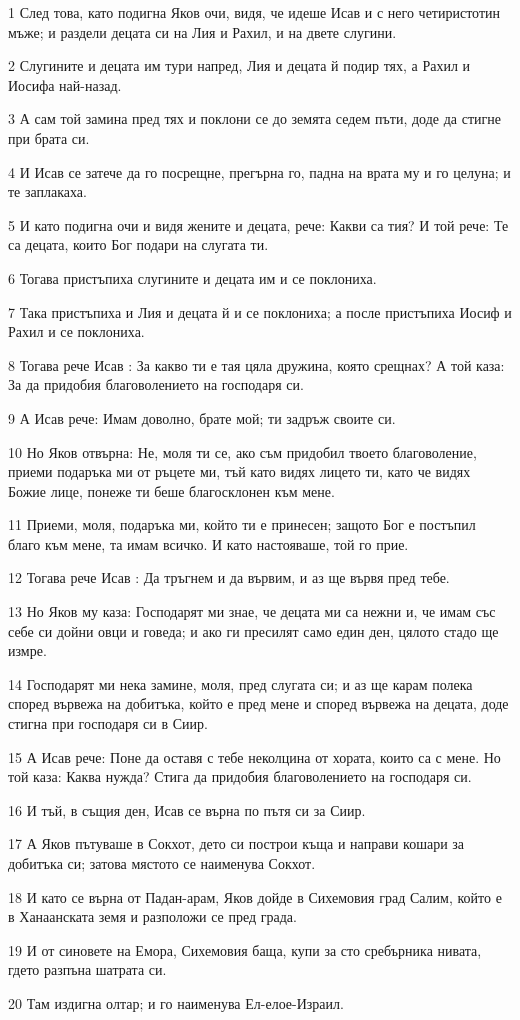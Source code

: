 \par 1 След това, като подигна Яков очи, видя, че идеше Исав и с него четиристотин мъже; и раздели децата си на Лия и Рахил, и на двете слугини.
\par 2 Слугините и децата им тури напред, Лия и децата й подир тях, а Рахил и Иосифа най-назад.
\par 3 А сам той замина пред тях и поклони се до земята седем пъти, доде да стигне при брата си.
\par 4 И Исав се затече да го посрещне, прегърна го, падна на врата му и го целуна; и те заплакаха.
\par 5 И като подигна очи и видя жените и децата, рече: Какви са тия? И той рече: Те са децата, които Бог подари на слугата ти.
\par 6 Тогава пристъпиха слугините и децата им и се поклониха.
\par 7 Така пристъпиха и Лия и децата й и се поклониха; а после пристъпиха Иосиф и Рахил и се поклониха.
\par 8 Тогава рече Исав : За какво ти е тая цяла дружина, която срещнах? А той каза: За да придобия благоволението на господаря си.
\par 9 А Исав рече: Имам доволно, брате мой; ти задръж своите си.
\par 10 Но Яков отвърна: Не, моля ти се, ако съм придобил твоето благоволение, приеми подаръка ми от ръцете ми, тъй като видях лицето ти, като че видях Божие лице, понеже ти беше благосклонен към мене.
\par 11 Приеми, моля, подаръка ми, който ти е принесен; защото Бог е постъпил благо към мене, та имам всичко. И като настояваше, той го прие.
\par 12 Тогава рече Исав : Да тръгнем и да вървим, и аз ще вървя пред тебе.
\par 13 Но Яков му каза: Господарят ми знае, че децата ми са нежни и, че имам със себе си дойни овци и говеда; и ако ги пресилят само един ден, цялото стадо ще измре.
\par 14 Господарят ми нека замине, моля, пред слугата си; и аз ще карам полека според вървежа на добитъка, който е пред мене и според вървежа на децата, доде стигна при господаря си в Сиир.
\par 15 А Исав рече: Поне да оставя с тебе неколцина от хората, които са с мене. Но той каза: Каква нужда? Стига да придобия благоволението на господаря си.
\par 16 И тъй, в същия ден, Исав се върна по пътя си за Сиир.
\par 17 А Яков пътуваше в Сокхот, дето си построи къща и направи кошари за добитъка си; затова мястото се наименува Сокхот.
\par 18 И като се върна от Падан-арам, Яков дойде в Сихемовия град Салим, който е в Ханаанската земя и разположи се пред града.
\par 19 И от синовете на Емора, Сихемовия баща, купи за сто сребърника нивата, гдето разпъна шатрата си.
\par 20 Там издигна олтар; и го наименува Ел-елое-Израил.

